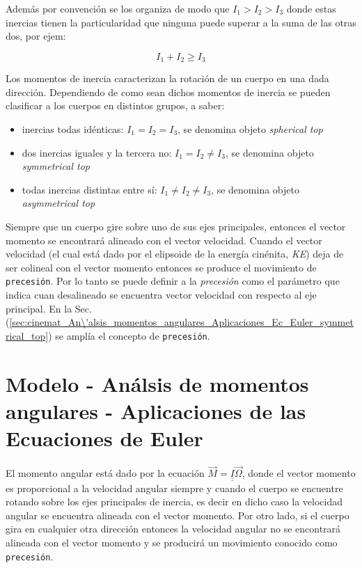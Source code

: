 \documentclass[oneside,a4paper,english,links]{amca}
\begin{document}
\noindent Adem\'as por convenci\'on se los organiza de modo que $I_1>I_2>I_3$ donde estas inercias tienen la particularidad que ninguna  puede superar a la suma de las otras dos, por ejem:

\begin{equation}
    I_1+I_2 \geq I_3
\end{equation}

Los momentos de inercia caracterizan la rotaci\'on de un cuerpo en una dada direcci\'on. Dependiendo de como sean dichos momentos de inercia se pueden clasificar a los cuerpos en distintos grupos, a saber:

\begin{itemize}
    \item inercias todas id\'enticas: $I_1=I_2= I_3$, se denomina objeto \textit{spherical top}
    \item dos inercias iguales y la tercera no: $I_1=I_2 \neq I_3$, se denomina objeto \textit{symmetrical top}
    \item todas inercias distintas entre s\'i: $I_1\neq I_2\neq I_3$, se denomina objeto \textit{asymmetrical top}
\end{itemize}

Siempre que un cuerpo gire sobre uno de sus ejes principales, entonces el vector momento se encontrar\'a alineado con el vector velocidad. Cuando el vector velocidad (el cual est\'a dado por el elipsoide de la energ\'ia cin\'enita, \textit{KE}) deja de ser colineal con el vector momento entonces se produce el movimiento de \texttt{precesi\'on}. Por lo tanto se puede definir a la \textit{precesi\'on} como el par\'ametro que indica cuan desalineado se encuentra vector velocidad con respecto al eje principal. En la Sec.(\ref{sec:cinemat_An\'alsis_momentos_angulares_Aplicaciones_Ec_Euler_symmetrical_top}) se ampl\'ia el concepto de \texttt{precesi\'on}.


\section{Modelo - An\'alsis de momentos angulares - Aplicaciones de las Ecuaciones de Euler}
\label{sec:cinemat_modelo_An\'alsis_momentos_angulares_Aplicaciones_Ec_Euler}

El momento angular est\'a dado por la ecuaci\'on $\Vec{M}=\underline{\underline{I}} \Vec{\Omega}$, donde el vector momento es proporcional a la velocidad angular  siempre y cuando el cuerpo se encuentre rotando sobre los ejes principales de inercia, es decir en dicho caso la velocidad angular se encuentra alineada con el vector momento. Por otro lado, si el cuerpo gira en cualquier otra direcci\'on entonces la velocidad angular no se encontrar\'a alineada con el vector momento y se producir\'a un movimiento conocido como \texttt{precesi\'on}.
\end{document}
